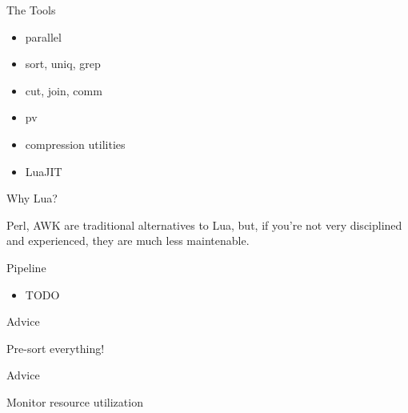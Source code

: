 \documentclass[handout]{beamer}
\begin{document}

\begin{frame}{The Tools}

\begin{itemize}
\item parallel
\item sort, uniq, grep
\item cut, join, comm
\item pv
\item compression utilities
\item LuaJIT
\end{itemize}

\end{frame}


\begin{frame}{Why Lua?}

Perl, AWK are traditional alternatives to Lua,
but, if you're not very disciplined and experienced,
they are much less maintenable.

\end{frame}


\begin{frame}{Pipeline}

\begin{itemize}
\item TODO
\end{itemize}

\end{frame}


\begin{frame}{Advice}

\Large Pre-sort everything!

\end{frame}


\begin{frame}{Advice}

\Large Monitor resource utilization

\end{frame}
\end{document}
